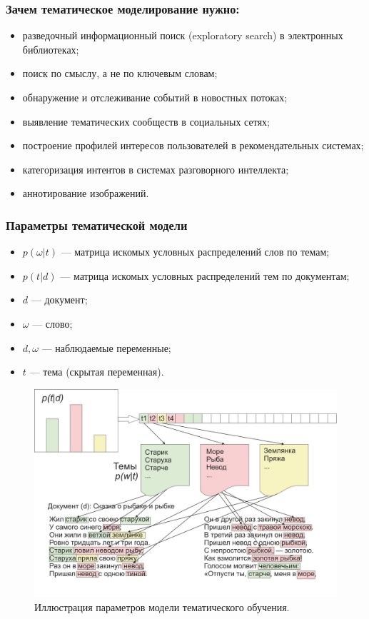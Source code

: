 \documentclass[10pt]{article}
\begin{document}
\subsubsection*{Зачем тематическое моделирование нужно:} 
\begin{itemize}
	\item разведочный информационный поиск (exploratory search) в электронных библиотеках;
	\item поиск по смыслу, а не по ключевым словам;
	\item обнаружение и отслеживание событий в новостных потоках;
	\item выявление тематических сообществ в социальных сетях;
	\item построение профилей интересов пользователей в рекомендательных системах;
	\item категоризация интентов в системах разговорного интеллекта;
	\item аннотирование изображений.
\end{itemize}

\subsubsection*{Параметры тематической модели }

\begin{itemize}
	\item $p(\omega | t)$  --- матрица искомых условных распределений слов по темам;
	\item $p(t | d)$ --- матрица искомых условных распределений тем по документам;
	\item $d$ --- документ;
	\item $\omega$ --- слово;
	\item $d,\omega$  --- наблюдаемые переменные;
	\item $t$  --- тема (скрытая переменная).
\end{itemize}

\begin{figure}[H]
	\begin{center}
		\includegraphics[scale = 1.5]{TM.png}
		\caption{Иллюстрация параметров модели тематического обучения.}
	\end{center}
\end{figure}
\end{document}

